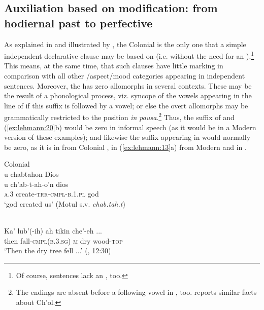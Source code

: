 \documentclass[output=paper]{langsci/langscibook}
\begin{document}
\subsection{Auxiliation based on modification: from hodiernal past to perfective}\label{sec:lehmann:4.6}
As explained in  and illustrated by , the Colonial    is the only one that a simple independent declarative clause may be based on (i.e. without the need for an ).\footnote{Of course,  sentences lack an , too.} This means, at the same time, that such clauses have little marking in comparison with all other /aspect/mood categories appearing in independent sentences. Moreover, the  has zero allomorphs in several contexts. These may be the result of a phonological process, viz. syncope of the vowels appearing in the  line of  if this suffix is followed by a vowel; or else the overt allomorphs may be grammatically restricted to the position \textit{in pausa}.\footnote{The  endings are absent before a following vowel in , too. \citet[§3.3]{Coon2010} reports similar facts about Ch'ol.} Thus, the   suffix of  and (\ref{ex:lehmann:20}b) would be zero in informal speech (as it would be in a Modern   version of these examples); and likewise the   suffix appearing in  would normally be zero, as it is in  from Colonial  , in (\ref{ex:lehmann:13}a) from Modern   and in .

\ea\label{ex:lehmann:14}
Colonial  \\
      u    chabtahon            Dios\\
\gll   u    ch’ab-t-ah-o’n        dios\\
\textsc{a.3}  create-\textsc{trr-cmpl-b.1.pl}    god\\
\glt ‘god created us’ (Motul s.v. \textit{c}\textit{h}\textit{ab.tah.t})
\z

\ea\label{ex:lehmann:15}
\\
\gll       Ka'  lub’(-ih)      ah  tikin    che'-eh ...  \\
  then  fall-\textsc{cmpl(b.3.sg)}  \textsc{m} dry    wood-\textsc{top}\\
\glt `Then the dry tree fell ...’ (\citealt{Hofling1991}, 12:30)
\z
\end{document}
